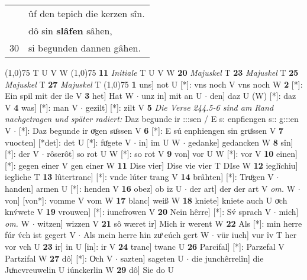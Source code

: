 \documentclass[8pt,a4paper,notitlepage]{article}
\begin{document}
\begin{table}[ht]
\begin{minipage}[t]{0.5\linewidth}
\begin{tabular}{rl}
 & ûf den tepich die kerzen sîn.\\ 
 & dô sin \textbf{slâfen} sâhen,\\ 
30 & si begunden dannen gâhen.\\ 
\end{tabular}
\scriptsize
\line(1,0){75} \newline
T U V W \newline
\line(1,0){75} \newline
\textbf{11} \textit{Initiale} T U V W  \textbf{20} \textit{Majuskel} T  \textbf{23} \textit{Majuskel} T  \textbf{25} \textit{Majuskel} T  \textbf{27} \textit{Majuskel} T  \newline
\line(1,0){75} \newline
\textbf{1} uns] not U [*]: vns noch V vns noch W \textbf{2} [*]: Ein spil mit der ile V \textbf{3} het] Hat W  $\cdot$ unz in] mit an U  $\cdot$ den] daz U (W) [*]: daz  V \textbf{4} was] [*]: man V  $\cdot$ gezilt] [*]: zilt V \textbf{5} \textit{Die Verse 244.5-6 sind am Rand nachgetragen und später radiert:} Daz begunde ir :::sen / E s: enpfiengen s:: g:::en V   $\cdot$ [*]: Daz begunde ir oͮgen suͤssen V \textbf{6} [*]: E sú enphiengen sin gruͤssen V \textbf{7} vuocten] [*det]: det U [*]: fuͤgete V  $\cdot$ in] im U W  $\cdot$ gedanke] gedancken W \textbf{8} sîn] [*]: der V  $\cdot$ rôserôt] so rot U W [*]: so rot V \textbf{9} von] vor U W [*]: vor V \textbf{10} einen] [*]: gegen einer V gen einer W \textbf{11} Dise vier] Dise vie vier T DIse W \textbf{12} ieglîchiu] iegliche T \textbf{13} lûtertranc] [*]: vnde lúter trang V \textbf{14} brâhten] [*]: Truͦgen V  $\cdot$ handen] armen U [*]: henden V \textbf{16} obez] ob iz U  $\cdot$ der art] der der art V \textit{om.} W  $\cdot$ von] [von*]: vomme V vom W \textbf{17} blanc] weiß W \textbf{18} kniete] kniete auch U oͮch knv́wete V \textbf{19} vrouwen] [*]: iuncfrowen V \textbf{20} Nein hêrre] [*]: Sv́ sprach V  $\cdot$ mich] \textit{om.} W  $\cdot$ witzen] wizzen V \textbf{21} sô wæret ir] Mich ir werent W \textbf{22} Als [*]: min herre fúr v́ch ist gegert V  $\cdot$ Als mein herre hin zuͦ eúch gert W  $\cdot$ vür iuch] vur îv T her vor vch U \textbf{23} ir] in U [in]: ir V \textbf{24} tranc] twanc U \textbf{26} Parcifal] [*]: Parzefal V Partzifal W \textbf{27} dô] [*]: Oͮch V  $\cdot$ sazten] sageten U  $\cdot$ die junchêrrelîn] die Juͦncvreuwelin U iúnckerlin W \textbf{29} dô] Sie do U \newline
\end{minipage}
\end{table}
\end{document}
